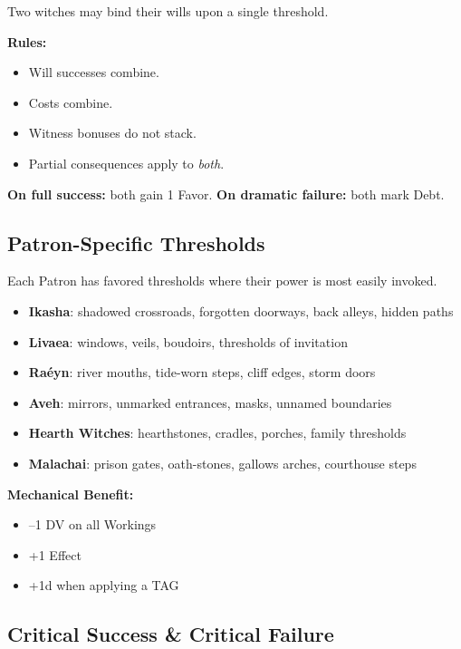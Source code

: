 \documentclass[11pt]{book}
\begin{document}
Two witches may bind their wills upon a single threshold.

\textbf{Rules:}
\begin{itemize}[noitemsep]
    \item Will successes combine.
    \item Costs combine.
    \item Witness bonuses do not stack.
    \item Partial consequences apply to \emph{both}.
\end{itemize}

\textbf{On full success:} both gain 1 Favor.  
\textbf{On dramatic failure:} both mark Debt.


\subsection*{Patron-Specific Thresholds}

Each Patron has favored thresholds where their power is most easily invoked.

\begin{itemize}[noitemsep]
    \item \textbf{Ikasha}: shadowed crossroads, forgotten doorways, back alleys, hidden paths
    \item \textbf{Livaea}: windows, veils, boudoirs, thresholds of invitation
    \item \textbf{Raéyn}: river mouths, tide-worn steps, cliff edges, storm doors
    \item \textbf{Aveh}: mirrors, unmarked entrances, masks, unnamed boundaries
    \item \textbf{Hearth Witches}: hearthstones, cradles, porches, family thresholds
    \item \textbf{Malachai}: prison gates, oath-stones, gallows arches, courthouse steps
\end{itemize}

\textbf{Mechanical Benefit:}
\begin{itemize}[noitemsep]
    \item --1 DV on all Workings
    \item +1 Effect
    \item +1d when applying a TAG
\end{itemize}


\subsection*{Critical Success \& Critical Failure}
\end{document}
